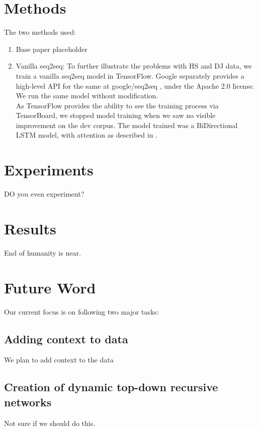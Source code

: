 \documentclass{IEEEtran}
\begin{document}
    \section{Methods}

    The two methods used:

    \begin{enumerate}
        \item Base paper placeholder
        \item Vanilla seq2seq: To further illustrate the problems with HS and DJ data, we train a 
          vanilla seq2seq model in TensorFlow. Google separately provides a high-level API for 
          the same at google/seq2seq \cite{britz2017}, under the Apache 2.0 license. 
          We run the same model without modification. \\
          As TensorFlow provides the ability to see the training process via TensorBoard, we
          stopped model training when we saw no visible improvement on the dev corpus. The model
          trained was a BiDirectional LSTM model, with attention as described in 
          \cite{bahdanau2014neural}.
    \end{enumerate}

    \section{Experiments}

    DO you even experiment?

    \section{Results}

    End of humanity is near.

    \section{Future Word}
      Our current focus is on following two major tasks:
      \subsection{Adding context to data}
        We plan to add context to the data
      \subsection{Creation of dynamic top-down recursive networks}
        Not sure if we should do this. 

    
    
\end{document}
